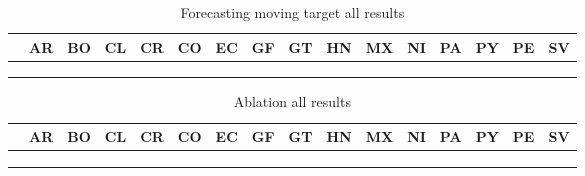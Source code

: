\begin{table*}[t!]
  \centering
  \caption{\label{tb:moving}  Forecasting moving target all results}
\begin{tabular}{|*{16}{l|}}
\hline
 & AR & BO & CL & CR & CO & EC & GF & GT & HN & MX & NI & PA & PY & PE & SV \\
\hline \hline
 &    &    &    &    &    &    &    &    &    &    &    &    &    &    &    \\
 &    &    &    &    &    &    &    &    &    &    &    &    &    &    &    \\
 &    &    &    &    &    &    &    &    &    &    &    &    &    &    &   \\
\hline
\end{tabular}
\end{table*}

\begin{table*}[t!]
  \centering
  \caption{\label{tb:Ablation}  Ablation all results}
\begin{tabular}{|*{16}{l|}}
\hline
 & AR & BO & CL & CR & CO & EC & GF & GT & HN & MX & NI & PA & PY & PE & SV \\
\hline \hline
 &    &    &    &    &    &    &    &    &    &    &    &    &    &    &    \\
 &    &    &    &    &    &    &    &    &    &    &    &    &    &    &    \\
 &    &    &    &    &    &    &    &    &    &    &    &    &    &    &   \\
\hline
\end{tabular}
\end{table*}
